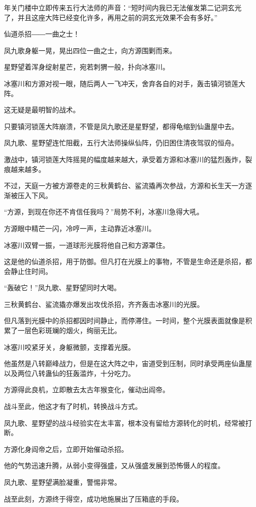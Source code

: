 \begin{this_body}
年关门楼中立即传来五行大法师的声音：“短时间内我已无法催发第二记洞玄光了，并且这座大阵已经变化许多，再用之前的洞玄光效果不会有多好。”

仙道杀招――一曲之士！

凤九歌身躯一晃，晃出四位一曲之士，向方源围剿而来。

星野望着浑身绽射星芒，宛若刺猬一般，扑向冰塞川。

冰塞川和方源对视一眼，随后两人一飞冲天，舍弃各自的对手，轰击镇河锁莲大阵。

这无疑是最明智的战术。

只要镇河锁莲大阵崩溃，不管是凤九歌还是星野望，都得龟缩到仙蛊屋中去。

凤九歌、星野望连忙阻截，五行大法师操纵仙阵，仍旧困住清夜驾驭的恒舟。

激战中，镇河锁莲大阵摇晃的幅度越来越大，承受着方源和冰塞川的猛烈轰炸，裂痕越来越多。

不过，天庭一方被方源卷走的三秋黄鹤台、鲨流撬再次参战，方源和长生天一方逐渐被压入下风。

“方源，到现在你还不肯信任我吗？”局势不利，冰塞川急得大吼。

方源眼中精芒一闪，冷哼一声，主动靠近冰塞川。

冰塞川双臂一振，一道球形光膜将他自己和方源罩住。

这是他的仙道杀招，用于防御。但凡打在光膜上的事物，不管是生命还是杀招，都会静止住时间。

“轰破它！”凤九歌、星野望同时大喝。

三秋黄鹤台、鲨流撬亦爆发出攻伐杀招，齐齐轰击冰塞川的光膜。

但凡落到光膜中的杀招都因时间静止，而停滞住。一时间，整个光膜表面就像是积累了一层色彩斑斓的烟火，绚丽无比。

冰塞川咬紧牙关，身躯微颤，支撑着光膜。

他虽然是八转巅峰战力，但是在这大阵之中，宙道受到压制，同时承受两座仙蛊屋以及两位八转蛊仙的狂轰滥炸，十分吃力。

方源得此良机，立即散去太古年猴变化，催动出阎帝。

战斗至此，他这才有了时机，转换战斗方式。

凤九歌、星野望的战斗经验实在太丰富，根本没有留给方源转化的时机，经常被打断。

方源化身阎帝之后，立即开始催动杀招。

他的气势迅速升腾，从弱小变得强盛，又从强盛发展到恐怖慑人的程度。

凤九歌、星野望满脸凝重，警惕非常。

战至此刻，方源终于得空，成功地施展出了压箱底的手段。


\end{this_body}
